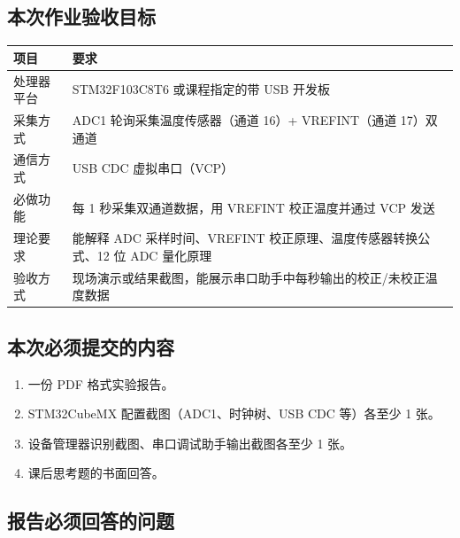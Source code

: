 \documentclass[
  chinese,
  UTF8,
  oneside,
  openany]{ctexbook}
\providecommand{\tightlist}{%
  \setlength{\itemsep}{0pt}\setlength{\parskip}{0pt}}
\begin{document}
\subsection{本次作业验收目标}\label{ux672cux6b21ux4f5cux4e1aux9a8cux6536ux76eeux6807-4}

\begin{longtable}[]{@{}
  >{\raggedright\arraybackslash}p{}
  >{\raggedright\arraybackslash}p{}@{}}
\toprule\noalign{}
\begin{minipage}[b]{\linewidth}\raggedright
项目
\end{minipage} & \begin{minipage}[b]{\linewidth}\raggedright
要求
\end{minipage} \\
\midrule\noalign{}
\endhead
\bottomrule\noalign{}
\endlastfoot
处理器平台 & STM32F103C8T6 或课程指定的带 USB 开发板 \\
采集方式 & ADC1 轮询采集温度传感器（通道 16）+ VREFINT（通道
17）双通道 \\
通信方式 & USB CDC 虚拟串口（VCP） \\
必做功能 & 每 1 秒采集双通道数据，用 VREFINT 校正温度并通过 VCP 发送 \\
理论要求 & 能解释 ADC 采样时间、VREFINT 校正原理、温度传感器转换公式、12
位 ADC 量化原理 \\
验收方式 &
现场演示或结果截图，能展示串口助手中每秒输出的校正/未校正温度数据 \\
\end{longtable}

\subsection{本次必须提交的内容}\label{ux672cux6b21ux5fc5ux987bux63d0ux4ea4ux7684ux5185ux5bb9-4}

\begin{enumerate}
\def\labelenumi{\arabic{enumi}.}
\tightlist
\item
  一份 PDF 格式实验报告。
\item
  STM32CubeMX 配置截图（ADC1、时钟树、USB CDC 等）各至少 1 张。
\item
  设备管理器识别截图、串口调试助手输出截图各至少 1 张。
\item
  课后思考题的书面回答。
\end{enumerate}

\subsection{报告必须回答的问题}\label{ux62a5ux544aux5fc5ux987bux56deux7b54ux7684ux95eeux9898-4}
\end{document}
